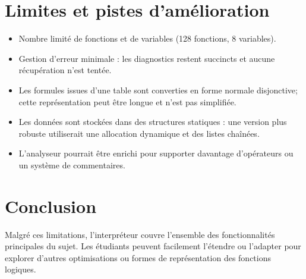 \documentclass[11pt,a4paper]{article}
\begin{document}
\section*{Limites et pistes d'amélioration}
\begin{itemize}
  \item Nombre limité de fonctions et de variables (128 fonctions, 8 variables).
  \item Gestion d'erreur minimale : les diagnostics restent succincts et aucune récupération n'est tentée.
  \item Les formules issues d'une table sont converties en forme normale disjonctive; cette représentation peut être longue et n'est pas simplifiée.
  \item Les données sont stockées dans des structures statiques : une version plus robuste utiliserait une allocation dynamique et des listes chaînées.
  \item L'analyseur pourrait être enrichi pour supporter davantage d'opérateurs ou un système de commentaires.
\end{itemize}
\section*{Conclusion}
Malgré ces limitations, l'interpréteur couvre l'ensemble des fonctionnalités principales du sujet. Les étudiants peuvent facilement l'étendre ou l'adapter pour explorer d'autres optimisations ou formes de représentation des fonctions logiques.
\end{document}
